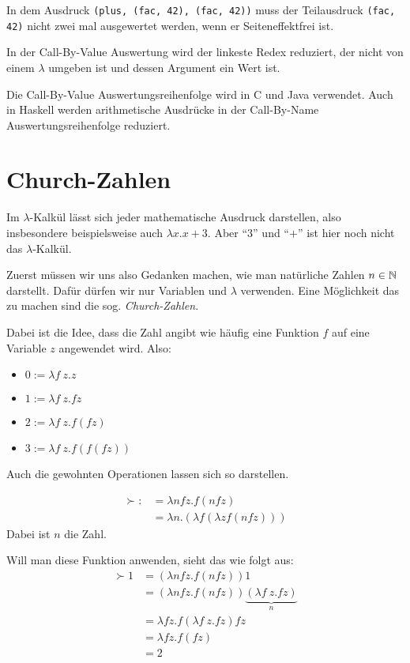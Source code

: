 \begin{beispiel}[Sharing]
    In dem Ausdruck \texttt{(plus, (fac, 42), (fac, 42))} muss der Teilausdruck
    \texttt{(fac, 42)} nicht zwei mal ausgewertet werden, wenn er Seiteneffektfrei
    ist.
\end{beispiel}

\begin{definition}%
    In der Call-By-Value Auswertung wird der linkeste Redex reduziert, der
    nicht von einem $\lambda$ umgeben ist und dessen Argument ein Wert ist.
\end{definition}

Die Call-By-Value Auswertungsreihenfolge wird in C und Java verwendet.
Auch in Haskell werden arithmetische Ausdrücke in der Call-By-Name Auswertungsreihenfolge reduziert.

\section{Church-Zahlen}
Im $\lambda$-Kalkül lässt sich jeder mathematische Ausdruck darstellen, also
insbesondere beispielsweise auch $\lambda x. x+3$. Aber \enquote{$3$} und
\enquote{$+$} ist hier noch nicht das $\lambda$-Kalkül.

Zuerst müssen wir uns also Gedanken machen, wie man natürliche Zahlen $n \in \mathbb{N}$
darstellt. Dafür dürfen wir nur Variablen und $\lambda$ verwenden. Eine Möglichkeit
das zu machen sind die sog. \textit{Church-Zahlen}.

Dabei ist die Idee, dass die Zahl angibt wie häufig eine Funktion $f$ auf eine
Variable $z$ angewendet wird. Also:
\begin{itemize}
    \item $0 := \lambda f~z. z$
    \item $1 := \lambda f~z. f z$
    \item $2 := \lambda f~z. f (f z)$
    \item $3 := \lambda f~z. f (f (f z))$
\end{itemize}

Auch die gewohnten Operationen lassen sich so darstellen.

\begin{beispiel}
    \begin{align*}
        \succ :&= \lambda n f z. f (n f z)\\
               &= \lambda n. (\lambda f  (\lambda z f (n f z)))
    \end{align*}
    Dabei ist $n$ die Zahl.

    Will man diese Funktion anwenden, sieht das wie folgt aus:
    \begin{align*}
    \succ 1&= (\lambda n f z. f(n f z)) 1\\
           &= (\lambda n f z. f(n f z)) \underbrace{(\lambda f~z. f z)}_{n}\\
           &= \lambda f z. f (\lambda f~z. f z) f z\\
           &= \lambda f z. f (f z)\\
           &= 2
    \end{align*}
\end{beispiel}

